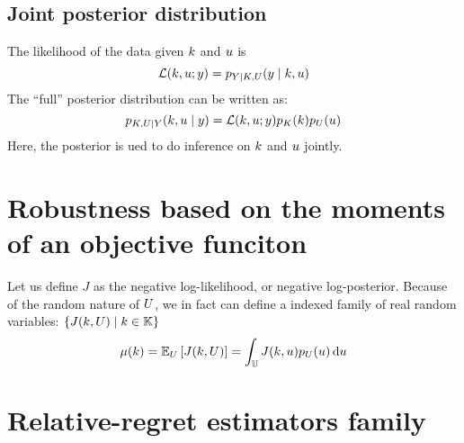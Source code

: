 \documentclass[../../Main_ManuscritThese.tex]{subfiles}
\begin{document}
\subsection{Joint posterior distribution}
The likelihood of the data given $k$ and $u$ is
\begin{equation}
  \mathcal{L}(k,u;y) = p_{Y \mid K, U}(y\mid k,u)
\end{equation}
The ``full'' posterior distribution can be written as:
\begin{equation}
  p_{K,U \mid Y}(k,u \mid y) = \mathcal{L}(k,u;y)p_{K}(k)p_{U}(u)
\end{equation}
Here, the posterior is ued to do inference on $k$ and $u$ jointly.
\section{Robustness based on the moments of an objective funciton}
\label{sec:rob_moments}
Let us define $J$ as the negative log-likelihood, or negative log-posterior.
Because of the random nature of $U$, we in fact can define a indexed family of real random variables: $\{J(k,U) \mid k \in \mathbb{K}\}$
\begin{equation}
  \mu(k) = \mathbb{E}_U\left[J(k,U)\right] =\int_{\mathbb{U}} J(k,u)p_U(u)\,\mathrm{d}u
\end{equation}

\section{Relative-regret estimators family}
\label{sec:rr_family}



\subfileLocal{
	\pagestyle{empty}
	
	
      }
\end{document}
